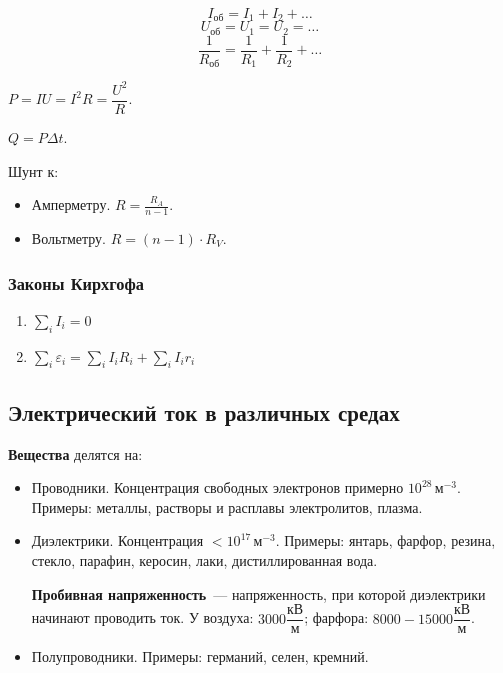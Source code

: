 \documentclass[12pt]{article}
\begin{document}
	\begin{definition}
		\[ I_{\text{об}} = I_{1} + I_{2} + \dots \]
		\[ U_{\text{об}} = U_{1} = U_{2} = \dots \]
		\[ \frac{1}{R_{\text{об}}} = \frac{1}{R_{1}} + \frac{1}{R_{2}} + \dots \]
	\end{definition}
	
	\begin{definition}
		$P = IU = I^2 R = \dfrac{U^2}{R}$.
	\end{definition}
	
	\begin{definition}
		$Q = P \varDelta t$.
	\end{definition}
	
	\begin{definition}
		Шунт к:
		\begin{itemize}
			\item Амперметру. $R = \frac{R_{A}}{n - 1}$.
			\item Вольтметру. $R = (n - 1) \cdot R_{V}$.
		\end{itemize}
	\end{definition}
	
	\subsubsection{Законы Кирхгофа}
	
	\begin{enumerate}
		\item $\sum\limits_i I_i = 0$
		\item $\sum\limits_i \varepsilon_i = \sum\limits_i I_i R_i + \sum\limits_i I_i r_i$
	\end{enumerate}
	
	\subsection{Электрический ток в различных средах}
	
	\textbf{Вещества} делятся на:
	
	\begin{itemize}
		\item Проводники. Концентрация свободных электронов примерно $10^{28} \, \text{м}^{-3}$. Примеры: металлы, растворы и расплавы электролитов, плазма.
		
		\item Диэлектрики. Концентрация $< 10^{17} \, \text{м}^{-3}$. Примеры: янтарь, фарфор, резина, стекло, парафин, керосин, лаки, дистиллированная вода.
		
		\textbf{Пробивная напряженность}~--- напряженность, при которой диэлектрики начинают проводить ток. У воздуха: $3000 \dfrac{\text{кВ}}{\text{м}}$; фарфора: $8000-15000 \dfrac{\text{кВ}}{\text{м}}$.
		
		\item Полупроводники. Примеры: германий, селен, кремний.
	\end{itemize}
	
\end{document}
